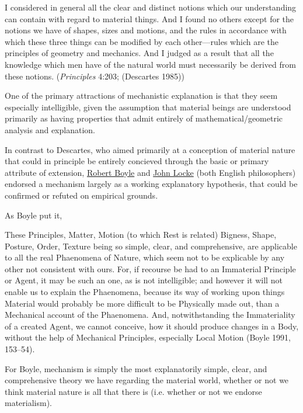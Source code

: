 \documentclass[12pt]{article}
\makeatletter
\newcommand{\citeprocitem}[2]{\hyper@linkstart{cite}{citeproc_bib_item_#1}#2\hyper@linkend}
\makeatother
\begin{document}
\begin{quote-b}
I considered in general all the clear and distinct notions which our
understanding can contain with regard to material things. And I found no others
except for the notions we have of shapes, sizes and motions, and the rules in
accordance with which these three things can be modified by each other—rules
which are the principles of geometry and mechanics. And I judged as a result
that all the knowledge which men have of the natural world must necessarily be
derived from these notions. (\emph{Principles} 4:203; (\citeprocitem{3}{Descartes 1985}))
\end{quote-b}

One of the primary attractions of mechanistic explanation is that they seem
especially intelligible, given the assumption that material beings are understood
primarily as having properties that admit entirely of mathematical/geometric analysis
and explanation. 

In contrast to Descartes, who aimed primarily at a conception of material nature that
could in principle be entirely concieved through the basic or primary attribute of
extension, \href{https://plato.stanford.edu/entries/boyle}{Robert Boyle} and \href{https://plato.stanford.edu/entries/locke/}{John Locke} (both English philosophers) endorsed a
mechanism largely as a working explanatory hypothesis, that could be confirmed or
refuted on empirical grounds.

As Boyle put it,

\begin{quote-b}
These Principles, Matter, Motion (to which Rest is related) Bigness, Shape,
Posture, Order, Texture being so simple, clear, and comprehensive, are
applicable to all the real Phaenomena of Nature, which seem not to be explicable
by any other not consistent with ours. For, if recourse be had to an Immaterial
Principle or Agent, it may be such an one, as is not intelligible; and however
it will not enable us to explain the Phaenomena, because its way of working upon
things Material would probably be more difficult to be Physically made out, than
a Mechanical account of the Phaenomena. And, notwithstanding the Immateriality
of a created Agent, we cannot conceive, how it should produce changes in a Body,
without the help of Mechanical Principles, especially Local Motion
(\citeprocitem{1}{Boyle 1991, 153–54}).
\end{quote-b}

For Boyle, mechanism is simply the most explanatorily simple, clear, and
comprehensive theory we have regarding the material world, whether or not we think
material nature is all that there is (i.e. whether or not we endorse materialism).
\end{document}
